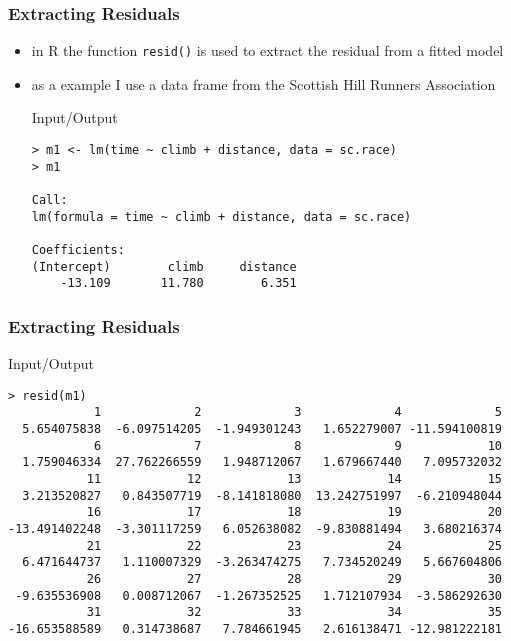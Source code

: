 \begin{frame}[fragile]\frametitle{Extracting Residuals}
  \begin{itemize}
  \item in R the function \texttt{resid()} is used to extract the residual from a fitted model
  \item as a example I use a data frame from the Scottish Hill Runners Association
    \begin{exampleblock}{Input/Output}\footnotesize
\begin{verbatim}
> m1 <- lm(time ~ climb + distance, data = sc.race)
> m1

Call:
lm(formula = time ~ climb + distance, data = sc.race)

Coefficients:
(Intercept)        climb     distance  
    -13.109       11.780        6.351  
\end{verbatim}
    \end{exampleblock}

  \end{itemize}
\end{frame}


\begin{frame}[fragile]\frametitle{Extracting Residuals}
  \begin{exampleblock}{Input/Output}\scriptsize
\begin{verbatim}
> resid(m1)
            1             2             3             4             5 
  5.654075838  -6.097514205  -1.949301243   1.652279007 -11.594100819 
            6             7             8             9            10 
  1.759046334  27.762266559   1.948712067   1.679667440   7.095732032 
           11            12            13            14            15 
  3.213520827   0.843507719  -8.141818080  13.242751997  -6.210948044 
           16            17            18            19            20 
-13.491402248  -3.301117259   6.052638082  -9.830881494   3.680216374
           21            22            23            24            25 
  6.471644737   1.110007329  -3.263474275   7.734520249   5.667604806 
           26            27            28            29            30 
 -9.635536908   0.008712067  -1.267352525   1.712107934  -3.586292630 
           31            32            33            34            35 
-16.653588589   0.314738687   7.784661945   2.616138471 -12.981222181 
\end{verbatim}
  \end{exampleblock}
\end{frame}


